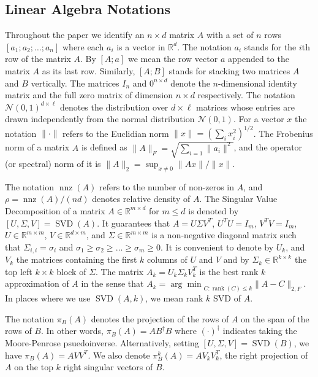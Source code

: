 \documentclass[11pt]{article}
\newcommand{\R}{\mathbb{R}}
\newcommand{\svd}{\operatorname{SVD}}
\newcommand{\rank}{\operatorname{rank}}
\newcommand{\nnz}{\operatorname{nnz}}
\begin{document}
\subsection{Linear Algebra Notations}

Throughout the paper we identify an $n \times d$ matrix $A$ with a set of $n$ rows $[a_1; a_2; \ldots; a_n]$ where each $a_i$ is a vector in $\R^d$.
The notation $a_i$ stands for the $i$th row of the matrix $A$.  By $[A ; a]$ we mean the row vector $a$ appended to the matrix $A$ as its last row. 
Similarly, $[A;B]$ stands for stacking two matrices $A$ and $B$ vertically.
The matrices $I_n$ and $0^{n \times d}$ denote the $n$-dimensional identity matrix and the full zero matrix of dimension $n \times d$ respectively. 
The notation $\mathcal{N}(0,1)^{d\times \ell}$ denotes the distribution over $d\times \ell$ matrices whose entries are drawn independently from the normal distribution $\mathcal{N}(0,1)$.
For a vector $x$ the notation $\|\cdot\|$ refers to the Euclidian norm $\|x\| = (\sum_i{x_i^2})^{1/2}$.
The Frobenius norm of a matrix $A$ is defined as $\|A\|_F = \sqrt{\sum_{i=1} \|a_i\|^2}$, and the operator (or spectral) norm of it is 
$\|A\|_2 = \sup_{x\ne 0}\|Ax\|/\|x\|$.


The notation $\nnz(A)$ refers to the number of non-zeros in $A$, and $\rho = \nnz(A) / (nd)$ denotes relative density of $A$.
The Singular Value Decomposition of a matrix $A \in \mathbb{R}^{m \times d}$ for $m \le d$ is denoted by $[U,\Sigma ,V] = \svd(A)$.
It guarantees that $A = U\Sigma V^T$, $U^TU = I_m$, $V^TV = I_m$, $U\in \R^{m \times m}$, $V\in \R^{d \times m}$,
and $\Sigma \in \R^{m \times m}$ is a non-negative diagonal matrix such that $\Sigma_{i,i} = \sigma_i$ and $\sigma_{1}\ge \sigma_{2} \ge \ldots \ge \sigma_{m} \ge 0$. 
It is convenient to denote by $U_k$, and $V_k$ the matrices containing the first $k$ columns of $U$ and $V$ and by $\Sigma_k \in \R^{k \times k}$ the top left $k \times k$ block of $\Sigma$.
The matrix $A_k = U_k \Sigma_k V_k^T$ is the best rank $k$ approximation of $A$ in the sense that $A_k = {\arg \min}_{C : \rank(C) \leq k} \|A - C\|_{2,F}$. In places where we use $\svd(A,k)$, we mean rank $k$ SVD of $A$.

The notation $\pi_B(A)$ denotes the projection of the rows of $A$ on the span of the rows of $B$. In other words, $\pi_B(A) = A B^\dagger B$ where $(\cdot)^\dagger$ indicates taking the Moore-Penrose psuedoinverse.
Alternatively, setting $[U,\Sigma ,V] = \svd(B)$, we have $\pi_B(A) = AVV^T$. We also denote $\pi_B^k(A) = AV_k V_k^T$, the right projection of $A$ on the top $k$ right singular vectors of $B$. 
\end{document}
